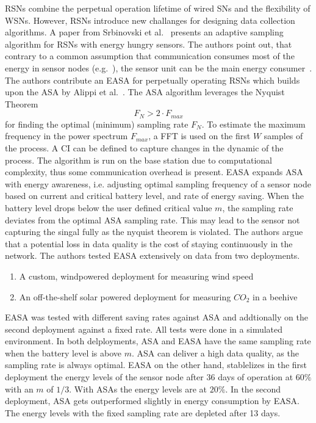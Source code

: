\acp{RSN} combine the perpetual operation lifetime of wired \acp{SN} and the
flexibility of \acp{WSN}. However, \acp{RSN} introduce new challanges for
designing data collection algorithms. A paper from Srbinovski et
al.~\cite{srbinovski2016energy} presents an adaptive sampling algorithm for
\acp{RSN} with energy hungry sensors. The authors point out, that contrary to a
common assumption that communication consumes most of the energy in sensor
nodes (e.g.~\cite{santini2006adaptive}), the sensor unit can be the main energy
consumer~\cite{boyle2012energy}. The authors contribute an \ac{EASA} for
perpetually operating \acp{RSN} which builds upon the \ac{ASA} by Alippi et
al.~\cite{alippi2007adaptive}. The \ac{ASA} algorithm leverages the Nyquist
Theorem $$ F_N > 2 \cdot F_{max} $$ for finding the optimal (minimum) sampling
rate $ F_N $. To estimate the maximum frequency in the power spectrum $ F_{max}
$, a \ac{FFT} is used on the first $ W $ samples of the process. A \ac{CI} can
be defined to capture changes in the dynamic of the process. The algorithm is
run on the base station due to computational complexity, thus some
communication overhead is present. \ac{EASA} expands \ac{ASA} with energy
awareness, i.e. adjusting optimal sampling frequency of a sensor node based on
current and critical battery level, and rate of energy saving. When the battery
level drops below the user defined critical value $ m $, the sampling rate
deviates from the optimal \ac{ASA} sampling rate. This may lead to the sensor
not capturing the singal fully as the nyquist theorem is violated. The authors
argue that a potential loss in data quality is the cost of staying continuously
in the network. The authors tested \ac{EASA} extensively on data from two
deployments.

\begin{enumerate}
    \item A custom, windpowered deployment for measuring wind speed
    \item An off-the-shelf solar powered deployment for measuring $ CO_2 $ in a beehive
\end{enumerate}

\ac{EASA} was tested with different saving rates against \ac{ASA} and
addtionally on the second deployment against a fixed rate. All tests were done
in a simulated environment. In both delployments, \ac{ASA} and \ac{EASA} have
the same sampling rate when the battery level is above $ m $. \ac{ASA} can
deliver a high data quality, as the sampling rate is always optimal. \ac{EASA}
on the other hand, stablelizes in the first deployment the energy levels of the
sensor node after 36 days of operation at $ 60\% $ with an $ m $ of $ 1/3 $.
With \acp{ASA} the energy levels are at $ 20\% $. In the second deployment,
\ac{ASA} gets outperformed slightly in energy consumption by \ac{EASA}. The
energy levels with the fixed sampling rate are depleted after 13 days.

